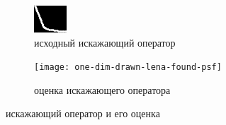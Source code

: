 \begin{figure}[h!]
	\centering
	\begin{subfigure}[b]{0.4\textwidth}
		\centering
		\includegraphics[width=\linewidth]{../input/drawn-psf2}
		\caption{исходный искажающий оператор}
		\label{fig:drawnPsf2}
	\end{subfigure}
	\begin{subfigure}[b]{0.4\textwidth}
		\centering
		\texttt{[image: one-dim-drawn-lena-found-psf]}
		\caption{оценка искажающего оператора}
	\end{subfigure}
	\caption{искажающий оператор и его оценка}
\end{figure}
\pagebreak
